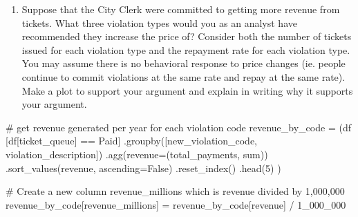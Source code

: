 \documentclass[
  letterpaper,
  DIV=11,
  numbers=noendperiod]{scrartcl}
\newenvironment{Shaded}{\begin{snugshade}}{\end{snugshade}}
\newcommand{\CommentTok}[1]{\textcolor[rgb]{0.37,0.37,0.37}{#1}}
\newcommand{\DecValTok}[1]{\textcolor[rgb]{0.68,0.00,0.00}{#1}}
\newcommand{\NormalTok}[1]{\textcolor[rgb]{0.00,0.23,0.31}{#1}}
\newcommand{\OperatorTok}[1]{\textcolor[rgb]{0.37,0.37,0.37}{#1}}
\newcommand{\StringTok}[1]{\textcolor[rgb]{0.13,0.47,0.30}{#1}}
\newcommand{\VariableTok}[1]{\textcolor[rgb]{0.07,0.07,0.07}{#1}}
\providecommand{\tightlist}{%
  \setlength{\itemsep}{0pt}\setlength{\parskip}{0pt}}\usepackage{longtable,booktabs,array}
\begin{document}
\begin{enumerate}
\def\labelenumi{\arabic{enumi}.}
\setcounter{enumi}{5}
\tightlist
\item
  Suppose that the City Clerk were committed to getting more revenue
  from tickets. What three violation types would you as an analyst have
  recommended they increase the price of? Consider both the number of
  tickets issued for each violation type and the repayment rate for each
  violation type. You may assume there is no behavioral response to
  price changes (ie. people continue to commit violations at the same
  rate and repay at the same rate). Make a plot to support your argument
  and explain in writing why it supports your argument.
\end{enumerate}

\begin{Shaded}
\begin{Highlighting}[]
\CommentTok{\# get revenue generated per year for each violation code}
\NormalTok{revenue\_by\_code }\OperatorTok{=}\NormalTok{ (df}
\NormalTok{    [df[}\StringTok{\textquotesingle{}ticket\_queue\textquotesingle{}}\NormalTok{] }\OperatorTok{==} \StringTok{\textquotesingle{}Paid\textquotesingle{}}\NormalTok{]}
\NormalTok{    .groupby([}\StringTok{\textquotesingle{}new\_violation\_code\textquotesingle{}}\NormalTok{, }\StringTok{\textquotesingle{}violation\_description\textquotesingle{}}\NormalTok{])}
\NormalTok{    .agg(revenue}\OperatorTok{=}\NormalTok{(}\StringTok{\textquotesingle{}total\_payments\textquotesingle{}}\NormalTok{, }\StringTok{\textquotesingle{}sum\textquotesingle{}}\NormalTok{))}
\NormalTok{    .sort\_values(}\StringTok{\textquotesingle{}revenue\textquotesingle{}}\NormalTok{, ascending}\OperatorTok{=}\VariableTok{False}\NormalTok{)}
\NormalTok{    .reset\_index()}
\NormalTok{    .head(}\DecValTok{5}\NormalTok{)}
\NormalTok{)}

\CommentTok{\# Create a new column \textquotesingle{}revenue\_millions\textquotesingle{} which is \textquotesingle{}revenue\textquotesingle{} divided by 1,000,000}
\NormalTok{revenue\_by\_code[}\StringTok{\textquotesingle{}revenue\_millions\textquotesingle{}}\NormalTok{] }\OperatorTok{=}\NormalTok{ revenue\_by\_code[}\StringTok{\textquotesingle{}revenue\textquotesingle{}}\NormalTok{] }\OperatorTok{/} \DecValTok{1\_000\_000}


\end{Highlighting}
\end{Shaded}
\end{document}
